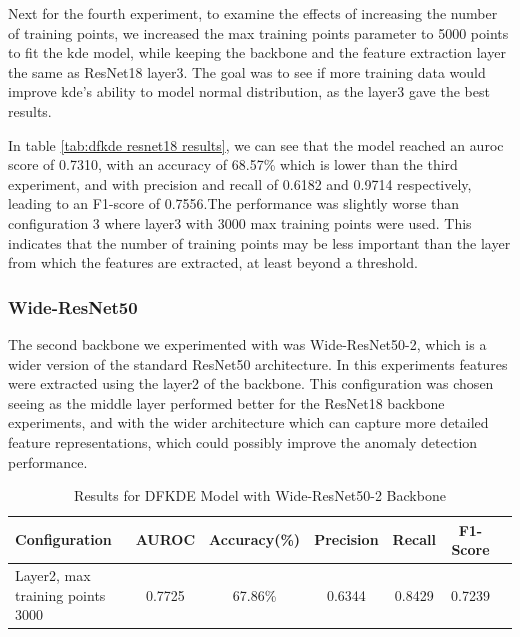 Next for the fourth experiment, to examine the effects of increasing the number of training points, we increased the max training points parameter to 5000 points to fit the \gls{kde} model, while keeping the backbone and the feature extraction layer the same as ResNet18 layer3. The goal was to see if more training data would improve \gls{kde}'s ability to model normal distribution, as the layer3 gave the best results.

In table \ref{tab:dfkde resnet18 results}, we can see that the model reached an \gls{auroc} score of 0.7310, with an accuracy of 68.57\% which is lower than the third experiment, and with precision and recall of 0.6182 and 0.9714 respectively, leading to an F1-score of 0.7556.The performance was slightly worse than configuration 3 where layer3 with 3000 max training points were used. This indicates that the number of training points may be less important than the layer from which the features are extracted, at least beyond a threshold.

\subsubsection*{Wide-ResNet50}

The second backbone we experimented with was Wide-ResNet50-2, which is a wider version of the standard ResNet50 architecture. In this experiments features were extracted using the layer2 of the backbone. This configuration was chosen seeing as the middle layer performed better for the ResNet18 backbone experiments, and with the wider architecture which can capture more detailed feature representations, which could possibly improve the anomaly detection performance.

\begin{table}[ht!]
    \centering
    \begin{tabular}{|l|c|c|c|c|c|c|}
        \hline
        \textbf{Configuration} & \textbf{AUROC} & \textbf{Accuracy(\%)} & \textbf{Precision} & \textbf{Recall} & \textbf{F1-Score} \\ \hline
        Layer2, max training points 3000 & 0.7725 & 67.86\% & 0.6344 & 0.8429 & 0.7239 \\ \hline
    \end{tabular}
    \caption{Results for DFKDE Model with Wide-ResNet50-2 Backbone}
    \label{tab:dfkde wide-resnet50 results}
\end{table}


